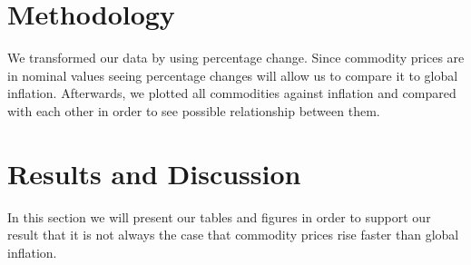\documentclass{scrartcl}
\begin{document}
\section{Methodology}
 We transformed our data by using percentage change. Since commodity prices are in nominal values seeing percentage changes will allow us to compare it to global inflation. Afterwards, we plotted all commodities against inflation and compared with each other in order to see possible relationship between them. 




\section{Results and Discussion}

In this section we will present our tables and figures in order to support our result that it is not always the case that commodity prices rise faster than global inflation.
\end{document}
